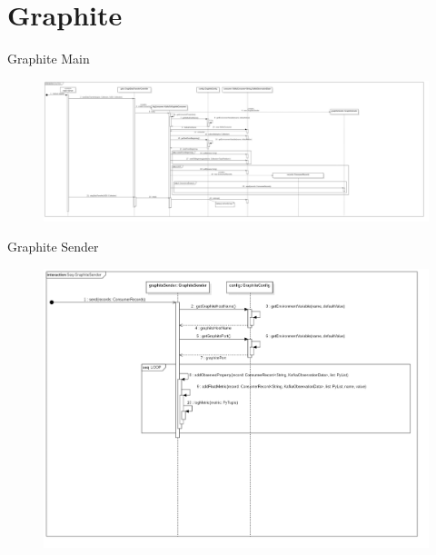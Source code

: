 \section{Graphite}
Graphite Main
\begin{figure}[!hbp]
	\centering
	\includegraphics[width=\linewidth]{images/graphite/GraphiteMainSequenceDiagram.png}
\end{figure}
\newpage
Graphite Sender
\begin{figure}[!hbp]
	\centering
	\includegraphics[width=\linewidth]{images/graphite/GraphiteSenderSequenceDiagram.png}
\end{figure}
\newpage


